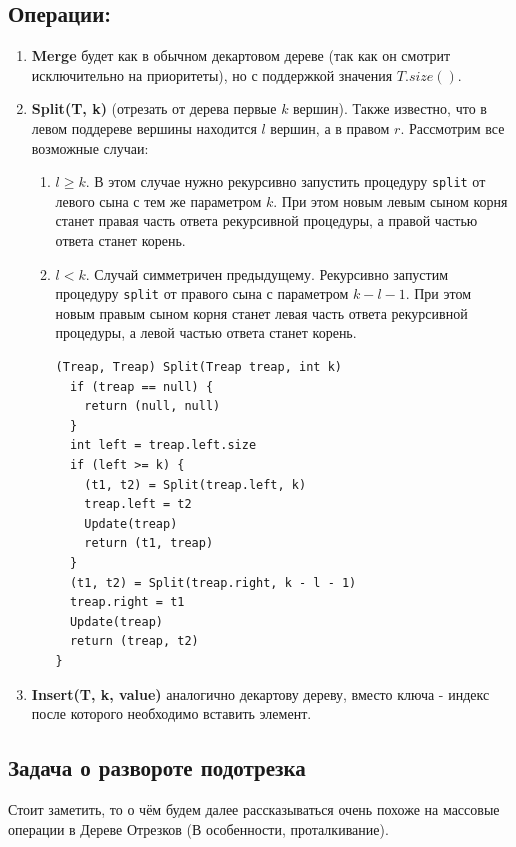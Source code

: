 \subsection{Операции:}
\begin{enumerate}
    \item \textbf{Merge} будет как в обычном декартовом дереве (так как он смотрит исключительно на приоритеты), но с поддержкой значения $T.size()$.
    \item \textbf{Split(T, k)} (отрезать от дерева первые $k$ вершин). Также известно, что в левом поддереве вершины находится $l$ вершин, а в правом $r$. Рассмотрим все возможные случаи:
    \begin{enumerate}
        \item $l \geq k$. В этом случае нужно рекурсивно запустить процедуру \texttt{split} от левого сына с тем же параметром $k$. При этом новым левым сыном корня станет правая часть ответа рекурсивной процедуры, а правой частью ответа станет корень.
        \item $l < k$. Случай симметричен предыдущему. Рекурсивно запустим процедуру \texttt{split} от правого сына с параметром $k - l - 1$. При этом новым правым сыном корня станет левая часть ответа рекурсивной процедуры, а левой частью ответа станет корень.
\begin{lstlisting}
(Treap, Treap) Split(Treap treap, int k)
  if (treap == null) {
    return (null, null)
  }
  int left = treap.left.size
  if (left >= k) {
    (t1, t2) = Split(treap.left, k)
    treap.left = t2
    Update(treap)
    return (t1, treap)
  }
  (t1, t2) = Split(treap.right, k - l - 1)
  treap.right = t1
  Update(treap)
  return (treap, t2)
}
\end{lstlisting}
    \end{enumerate}
\item \textbf{Insert(T, k, value)} аналогично декартову дереву, вместо ключа - индекс после которого необходимо вставить элемент.
\end{enumerate}

\subsection{Задача о развороте подотрезка}

Стоит заметить, то о чём будем далее рассказываться очень похоже на массовые операции в Дереве Отрезков (В особенности, проталкивание).

\vspace{1cm}

